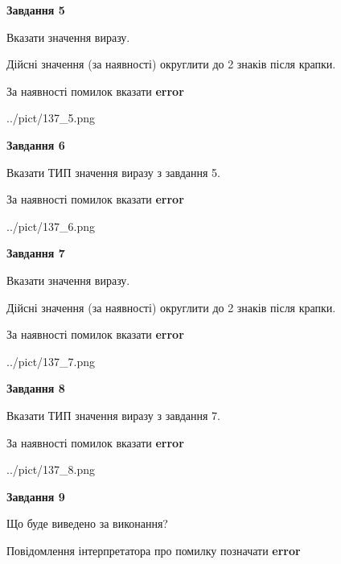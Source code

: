 \documentclass[11pt, ukrainian]{article}
\begin{document}
{\begin {large}
{\begin {center}\textbf{Завдання 5}\end {center}}\par
Вказати значення виразу. \par
Дійсні значення (за наявності) округлити до 2 знаків після крапки. \par
За наявності помилок вказати \textbf{error}

\begin{center}
	{../pict/137_5.png}
\end{center}
\newpage

{\begin {center}\textbf{Завдання 6}\end {center}}\par
Вказати ТИП значення виразу з завдання 5. \par
За наявності помилок вказати \textbf{error}

\begin{center}
	{../pict/137_6.png}
\end{center}
\newpage

{\begin {center}\textbf{Завдання 7}\end {center}}\par
Вказати значення виразу. \par
Дійсні значення (за наявності) округлити до 2 знаків після крапки. \par
За наявності помилок вказати \textbf{error}

\begin{center}
	{../pict/137_7.png}
\end{center}
\newpage

{\begin {center}\textbf{Завдання 8}\end {center}}\par
Вказати ТИП значення виразу з завдання 7. \par
За наявності помилок вказати \textbf{error}

\begin{center}
	{../pict/137_8.png}
\end{center}
\newpage

{\begin {center}\textbf{Завдання 9}\end {center}}\par
Що буде виведено за виконання? \par
Повідомлення інтерпретатора про помилку позначати \textbf{error}


\end{large}}
\end{document}
